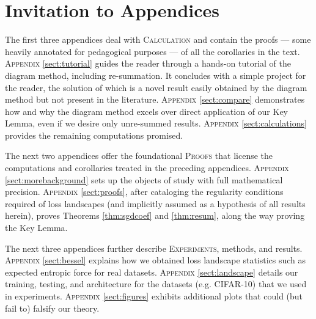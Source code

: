 \documentclass{article}
\theoremstyle{plain}
\theoremstyle{definition}
\begin{document}

    
    


\clearpage
\newpage
\renewcommand{\thesection}{\Alph{section}}
\setcounter{section}{0}

\section*{Invitation to Appendices}
    The first three appendices deal with \textsc{Calculation} and contain the
    proofs --- some heavily annotated for pedagogical purposes --- of all the
    corollaries in the text.
    \textsc{Appendix} \ref{sect:tutorial} guides the reader through a hands-on
        tutorial of the diagram method, including re-summation.  It
        concludes with a simple project for the reader, the solution of which
        is a novel result easily obtained by the diagram method but not present
        in the literature. 
    \textsc{Appendix} \ref{sect:compare} demonstrates how and why the diagram
        method excels over direct application of our Key Lemma, even if we
        desire only unre-summed results.
    \textsc{Appendix} \ref{sect:calculations} provides the remaining
        computations promised.

    The next two appendices offer the foundational \textsc{Proofs} that
    license the computations and corollaries treated in the preceding
    appendices.
    \textsc{Appendix} \ref{sect:morebackground} sets up the objects of study
        with full mathematical precision.
    \textsc{Appendix} \ref{sect:proofs}, after cataloging the regularity
        conditions required of loss landscapes (and implicitly assumed as a
        hypothesis of all results herein), proves Theorems \ref{thm:sgdcoef}
        and \ref{thm:resum}, along the way proving the Key Lemma.

    The next three appendices further describe \textsc{Experiments}, methods,
    and results.
    \textsc{Appendix} \ref{sect:bessel} explains how we obtained loss landscape
        statistics such as expected entropic force for real datasets.
    \textsc{Appendix} \ref{sect:landscape} details our training, testing, and
        architecture for the datasets (e.g. CIFAR-10) that we used in
        experiments.
    \textsc{Appendix} \ref{sect:figures} exhibits additional plots that could
        (but fail to) falsify our theory.
\end{document}
